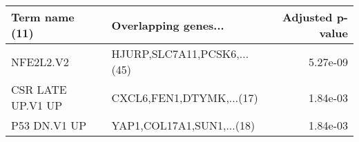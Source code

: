 \begin{tabular}{llr}
\toprule
   Term name (11) &        Overlapping genes... &  Adjusted p-value \\
\midrule
        NFE2L2.V2 & HJURP,SLC7A11,PCSK6,...(45) &          5.27e-09 \\
CSR LATE UP.V1 UP &    CXCL6,FEN1,DTYMK,...(17) &          1.84e-03 \\
     P53 DN.V1 UP &   YAP1,COL17A1,SUN1,...(18) &          1.84e-03 \\
\bottomrule
\end{tabular}
